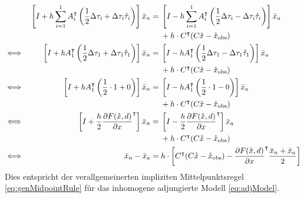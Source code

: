 \begin{align*}
&& \left[I +h\sum_{i=1}^1 A_i^\intercal \left(\frac{1}{2} \Delta \tau_i +\Delta \tau_i \mathring{\tau}_i\right) \right]\bar{x}_n &=\begin{aligned}[t]
   & \left[I - h\sum_{i=1}^1 A_i^\intercal  \left(\frac{1}{2}\Delta \tau_i-\Delta \tau_i \mathring{\tau}_i\right)\right]\bar{x}_a  \\
	&+	h\cdot C^\intercal(C\mathring{x} -\mathring{x}_{\text{obs}}) 
       \end{aligned} \\
\iff &&  \left[I +h A_1^\intercal \left(\frac{1}{2} \Delta \tau_1 +\Delta \tau_1 \mathring{\tau}_1\right) \right]\bar{x}_n &= 
  \begin{aligned}[t]	
&\left[I - h A_1^\intercal  \left(\frac{1}{2}\Delta \tau_1-\Delta \tau_1 \mathring{\tau}_1\right)\right]\bar{x}_a  \\
&+h\cdot C^\intercal(C\mathring{x} -\mathring{x}_{\text{obs}})
  \end{aligned} \\
\iff &&  \left[I +h A_1^\intercal \left(\frac{1}{2} \cdot 1+0\right) \right]\bar{x}_n &= \begin{aligned}[t]
&\left[I - h A_1^\intercal  \left(\frac{1}{2} \cdot 1-0\right)\right]\bar{x}_a \\
&+h\cdot C^\intercal(C\mathring{x} -\mathring{x}_{\text{obs}})                                                                                  
\end{aligned}\\
\iff &&  \left[ I +\frac{h}{2} \frac{\partial F(\mathring{x} ,d)}{\partial x}^\intercal \right]\bar{x}_n &= 
\begin{aligned}[t]
&\left[ I - \frac{h}{2}  \frac{\partial F(\mathring{x} ,d)}{\partial x}^\intercal  \right]\bar{x}_a \\
&+h\cdot C^\intercal(C\mathring{x} -\mathring{x}_{\text{obs}})\\
\end{aligned}\\
\iff &&  \bar{x}_n - \bar{x}_a &=h\cdot \left[C^\intercal(C\mathring{x} -\mathring{x}_{\text{obs}}) - \frac{\partial F(\mathring{x} ,d)}{\partial x}^\intercal  \frac{\bar{x}_n + \bar{x}_a}{2}\right]\\
\end{align*}
Dies entspricht der verallgemeinerten impliziten Mittelpunktsregel \eqref{eq:genMidpointRule} für das inhomogene adjungierte Modell \eqref{eq:adjModel}.
 

 
